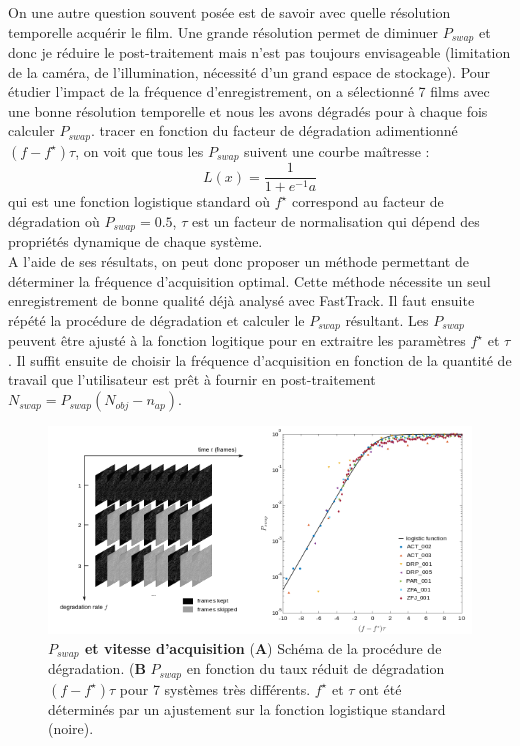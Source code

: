	On une autre question souvent posée est de savoir avec quelle résolution temporelle acquérir le film. Une grande résolution permet de diminuer $P_{swap}$ et donc je réduire le post-traitement mais n'est pas toujours envisageable (limitation de la caméra, de l'illumination, nécessité d'un grand espace de stockage).
	Pour étudier l'impact de la fréquence d'enregistrement, on a sélectionné 7 films avec une bonne résolution temporelle et nous les avons dégradés pour à chaque fois calculer $P_{swap}$. tracer en fonction du facteur de dégradation adimentionné $(f-f^{\star})\tau$, on voit que tous les $P_{swap}$ suivent une courbe maîtresse :
	$$
	    L(x)=\frac{1}{1+e^{-1}a}
	$$
	qui est une fonction logistique standard où $f^{\star}$ correspond au facteur de dégradation où $P_{swap}=0.5$, $\tau$ est un facteur de normalisation qui dépend des propriétés dynamique de chaque système.\\
	
	A l'aide de ses résultats, on peut donc proposer un méthode permettant de déterminer la fréquence d'acquisition optimal. Cette méthode nécessite un seul enregistrement de bonne qualité déjà analysé avec FastTrack. Il faut ensuite répété la procédure de dégradation et calculer le $P_{swap}$ résultant. Les $P_{swap}$ peuvent être ajusté à la fonction logitique pour en extraitre les paramètres $f^{\star}$ et $\tau$. Il suffit ensuite de choisir la fréquence d'acquisition en fonction de la quantité de travail que l'utilisateur est prêt à fournir en post-traitement $N_{swap}=P_{swap}(N_{obj}-n_{ap})$.
	
	\begin{figure}[h]
    \centering
    \includegraphics[width=1\textwidth]{part_1/assets/Figure_5.png}    
    \caption{\textbf{$P_{swap}$ et vitesse d’acquisition} (\textbf{A}) Schéma de la procédure de dégradation. (\textbf{B} $P_{swap}$ en fonction du taux réduit de dégradation $(f-f^{\star})\tau$ pour 7 systèmes très différents. $f^{\star}$ et $\tau$ ont été déterminés par un ajustement sur la fonction logistique standard (noire).}
    \label{part_1:fig_5}
    \end{figure}
	
